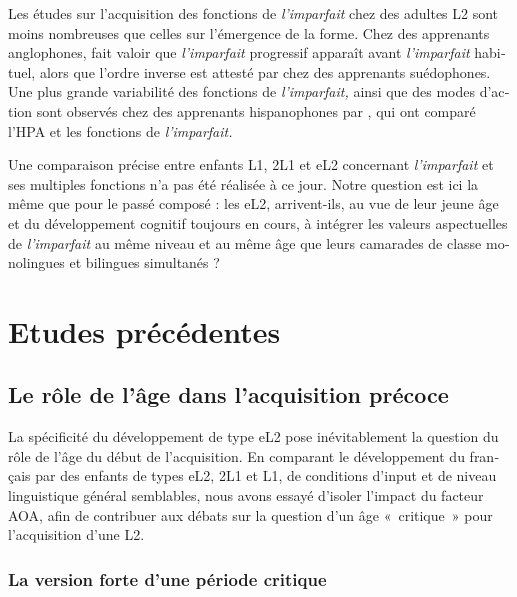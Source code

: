 \documentclass[french, output=paper]{langscibook}
\begin{document}
\begin{otherlanguage}{french}
  Les études sur l’acquisition des fonctions de \textit{l’imparfait} chez des adultes L2 sont moins nombreuses que celles sur l’émergence de la forme. Chez des apprenants anglophones, \citet{Howard2005} fait valoir que \textit{l’imparfait} progressif apparaît avant \textit{l’imparfait} habituel, alors que l’ordre inverse est attesté par \citet{Kihlstedt2002} chez des apprenants suédophones. Une plus grande variabilité des fonctions de \textit{l’imparfait,} ainsi que des modes d’action sont observés chez des apprenants hispanophones par \citet{IzquierdoKihlstedt2019}, qui ont comparé l’HPA et les fonctions de \textit{l’imparfait.}



   Une comparaison précise entre enfants L1, 2L1 et eL2 concernant \textit{l’imparfait} et ses multiples fonctions n’a pas été réalisée à ce jour. Notre question est ici la même que pour le passé composé : les eL2, arrivent-ils, au vue de leur jeune âge et du développement cognitif toujours en cours, à intégrer les valeurs aspectuelles de \textit{l’imparfait} au même niveau et au même âge que leurs camarades de classe monolingues et bilingues simultanés ? 


\section{Etudes précédentes}\label{sec:kihlstedt:2}

\subsection{Le rôle de l’âge dans l’acquisition précoce}\label{sec:kihlstedt:2.1}

La spécificité du développement de type eL2 pose inévitablement la question du rôle de l’âge du début de l’acquisition. En comparant le développement du français par des enfants de types eL2, 2L1 et L1, de conditions d’input et de niveau linguistique général semblables, nous avons essayé d’isoler l’impact du facteur AOA, afin de contribuer aux débats sur la question d’un âge «~critique~» pour l’acquisition d’une L2.


\subsubsection{La version forte d’une période critique}\label{sec:kihlstedt:2.1.1}


\end{otherlanguage}
\end{document}
